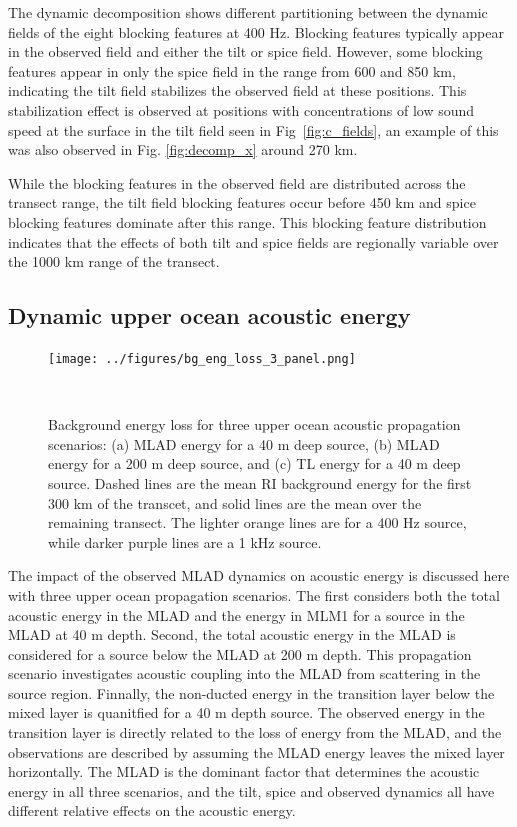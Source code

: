 \documentclass[preprint,NumberedRefs]{JASA}
\begin{document}
The dynamic decomposition shows different partitioning between the dynamic fields of the eight blocking features at 400 Hz. Blocking features typically appear in the observed field and either the tilt or spice field. However, some blocking features appear in only the spice field in the range from 600 and 850 km, indicating the tilt field stabilizes the observed field at these positions. This stabilization effect is observed at positions with concentrations of low sound speed at the surface in the tilt field seen in Fig~\ref{fig:c_fields}, an example of this was also observed in Fig. \ref{fig:decomp_x} around 270 km.

While the blocking features in the observed field are distributed across the transect range, the tilt field blocking features occur before 450 km and spice blocking features dominate after this range. This blocking feature distribution indicates that the effects of both tilt and spice fields are regionally variable over the 1000 km range of the transect.

\subsection{Dynamic upper ocean acoustic energy}\label{ssec:energy}
\begin{figure}
\texttt{[image: ../figures/bg\_eng\_loss\_3\_panel.png]}
        \caption{Background energy loss for three upper ocean acoustic propagation scenarios: (a) MLAD energy for a 40 m deep source, (b) MLAD energy for a 200 m deep source, and (c) TL energy for a 40 m deep source. Dashed lines are the mean RI background energy for the first 300 km of the transcet, and solid lines are the mean over the remaining transect. The lighter orange lines are for a 400 Hz source, while darker purple lines are a 1 kHz source.}
    \label{fig:eng_bg_3}
\end{figure}
The impact of the observed MLAD dynamics on acoustic energy is discussed here with three upper ocean propagation scenarios. The first considers both the total acoustic energy in the MLAD and the energy in MLM1 for a source in the MLAD at 40 m depth. Second, the total acoustic energy in the MLAD is considered for a source below the MLAD at 200 m depth. This propagation scenario investigates acoustic coupling into the MLAD from scattering in the source region. Finnally, the non-ducted energy in the transition layer below the mixed layer is quanitfied for a 40 m depth source. The observed energy in the transition layer is directly related to the loss of energy from the MLAD, and the observations are described by assuming the MLAD energy leaves the mixed layer horizontally. The MLAD is the dominant factor that determines the acoustic energy in all three scenarios, and the tilt, spice and observed dynamics all have different relative effects on the acoustic energy.
\end{document}
